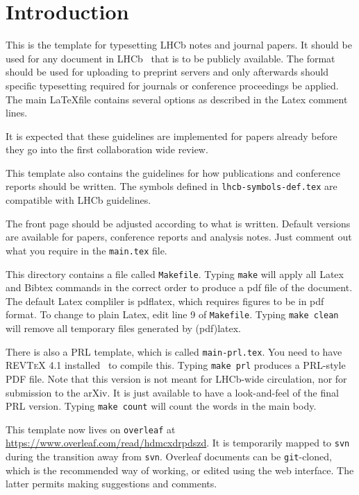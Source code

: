\section{Introduction}
\label{sec:Introduction}
 
This is the template for typesetting LHCb notes and journal papers.
It should be used for any document in LHCb~\cite{Alves:2008zz} that is to be
publicly available. The format should be used for uploading to
preprint servers and only afterwards should specific typesetting
required for journals or conference proceedings be applied. The main
\LaTeX file contains several options as described in the Latex comment
lines.
 
It is expected that these guidelines are implemented for papers already
before they go into the first collaboration wide review.
 
This template also contains the guidelines for how publications and
conference reports should be written.
The symbols defined in \texttt{lhcb-symbols-def.tex} are compatible with
LHCb guidelines.
 
The front page should be adjusted according to what is
written. Default versions are available for papers, conference reports
and analysis notes. Just comment out what you require in the
\texttt{main.tex} file.
 
This directory contains a file called \texttt{Makefile}.
Typing \texttt{make} will apply all Latex and Bibtex commands
in the correct order to produce a pdf file of the document.
The default Latex compliler is pdflatex, which requires figures
to be in pdf format.
To change to plain Latex, edit line 9 of \texttt{Makefile}.
Typing \texttt{make clean} will remove all temporary files generated by (pdf)latex.
 
There is also a PRL template, which is called \texttt{main-prl.tex}.  You need
to have \textsc{REVTeX 4.1} installed~\cite{REVTeX} to compile this. Typing
\texttt{make prl} produces a PRL-style PDF file. Note that this version is not
meant for LHCb-wide circulation, nor for submission to the arXiv. It is just
available to have a look-and-feel of the final PRL version. Typing \texttt{make
 count} will count the words in the main body.
 
 This template now lives on {\tt overleaf} at \url{https://www.overleaf.com/read/hdmcxdrpdszd}. It is temporarily mapped to {\tt svn} during the transition away from {\tt svn}.  Overleaf documents can be {\tt git}-cloned, which is the recommended way of working, or edited using the web interface. The latter permits making suggestions and comments.
%
%
